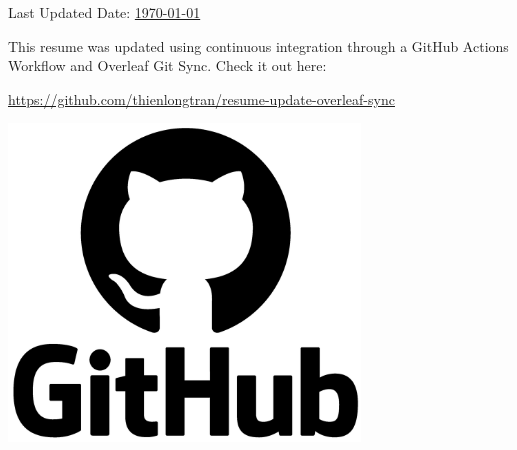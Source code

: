 \documentclass[letterpaper,11pt]{article}
\begin{document}
\vspace*{\fill}

\begin{minipage}{0.6\textwidth}

Last Updated Date: \underline{\today}\newline

This resume was updated using continuous integration through a GitHub Actions Workflow and Overleaf Git Sync. Check it out here:

\href{https://github.com/thienlongtran/resume-update-overleaf-sync}{https://github.com/thienlongtran/resume-update-overleaf-sync}
\end{minipage}
\hfill%
\begin{minipage}{0.3\textwidth}\raggedleft
\includegraphics[width=0.7\textwidth]{gha-logo.png}
\end{minipage}
\vspace*{\fill}

\end{document}
